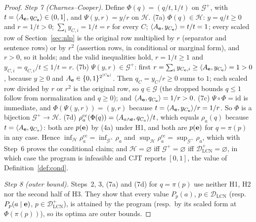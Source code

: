 \documentclass{article} %
\newcommand{\DLCN}{\mathcal{D}_{\mathrm{LCN}}}
\newcommand{\readoff}{\rho}
\providecommand{\readoffcc}{\readoff^{\mathrm{cc}}}
\begin{document}
\begin{proof}
\emph{Step 7 (Charnes--Cooper).} Define $\Phi(q)=(q/t,1/t)$ on $\mathcal G^+$, with
$t=\langle A_{\mathbf{e}},q_{C_{\mathbf{e}}}\rangle\in(0,1]$, and $\Psi(y,r)=y/r$ on $\mathcal H$.
(7a) $\Phi(q)\in\mathcal H$: $y=q/t\ge0$ and $r=1/t>0$; $\sum_iy_{C,i}=1/t=r$ for every
$C$; $\langle A_{\mathbf{e}},y_{C_{\mathbf{e}}}\rangle=t/t=1$; every scaled row of
Section~\ref{sec:nlp} is the original row multiplied by $r$ (separator and
sentence rows) or by $r^2$ (assertion rows, in conditional or marginal form), and
$r>0$, so it holds; and the
valid inequalities hold, $r=1/t\ge1$ and $y_{C,i}=q_{C,i}/t\le1/t=r$.
(7b) $\Psi(y,r)\in\mathcal G^+$: first $r=\sum_iy_{C_{\mathbf{e}},i}\ge\langle
A_{\mathbf{e}},y_{C_{\mathbf{e}}}\rangle=1>0$, because $y\ge0$ and $A_{\mathbf{e}}\in\{0,1\}^{2^{|C_{\mathbf{e}}|}}$.
Then $q_C=y_C/r\ge0$ sums to $1$; each scaled row divided by $r$ or $r^2$ is the
original row, so $q\in\mathcal G$ (the dropped bounds $q\le1$ follow from
normalization and $q\ge0$); and $\langle A_{\mathbf{e}},q_{C_{\mathbf{e}}}\rangle=1/r>0$.
(7c) $\Psi\circ\Phi=\mathrm{id}$ is immediate, and $\Phi(\Psi(y,r))=(y,r)$ because
$t=\langle A_{\mathbf{e}},y_{C_{\mathbf{e}}}\rangle/r=1/r$. So $\Phi$ is a bijection
$\mathcal G^+\to\mathcal H$. (7d) $\readoffcc_a(\Phi(q))=\langle
A_{a\wedge\be},q_{C_a}\rangle/t$, which equals $\readoff_a(q)$ because
$t=\langle A_{\mathbf{e}},q_{C_a}\rangle$: both are $p(\mathbf{e})$ by (4a) under H1, and both are
$p(\mathbf{e})$ for $q=\pi(p)$ in any case. Hence $\inf_{\mathcal H}\readoffcc_a=\inf_{\mathcal G^+}\readoff_a$
and $\sup_{\mathcal H}\readoffcc_a=\sup_{\mathcal G^+}\readoff_a$, which with Step~6
proves the conditional claim; and $\mathcal H=\varnothing$ iff
$\mathcal G^+=\varnothing$ iff $\DLCN^+=\varnothing$, in which case the program is
infeasible and \textsc{CJT} reports $[0,1]$, the value of
Definition~\ref{def:cond}.

\emph{Step 8 (outer bound).} Steps~2, 3, (7a) and (7d) for $q=\pi(p)$ use neither
H1, H2 nor the second half of H3. They show that every value $P_p(a)$, $p\in\DLCN$
(resp.\ $P_p(a\mid\mathbf{e})$, $p\in\DLCN^+$), is attained by the program (resp.\ by its
scaled form at $\Phi(\pi(p))$), so its optima are outer bounds.
\end{proof}
\end{document}
